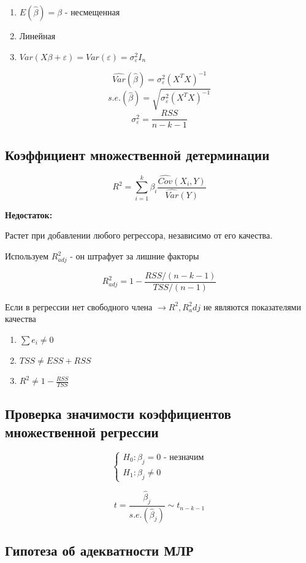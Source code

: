 \documentclass[a4paper, 12pt]{article}
\begin{document}
\begin{enumerate}
    \item $E(\hat{\beta}) = \beta$ - несмещенная
    \item Линейная
    \item $Var(X\beta + \varepsilon) = Var(\varepsilon) = \sigma_{\varepsilon}^2I_n$
\end{enumerate}

\[\hat{Var}(\hat{\beta}) = \sigma_{\varepsilon}^2(X^TX)^{-1}\]
\[s.e.(\hat{\beta}) = \sqrt{\sigma_{\varepsilon}^2(X^TX)^{-1}}\]
\[\sigma_{\varepsilon}^2 = \frac{RSS}{n - k - 1}\]

\subsection{Коэффициент множественной детерминации}

\[R^{2} = \sum_{i = 1}^k \beta_{i}\frac{\hat{Cov}(X_i, Y)}{\hat{Var}(Y)}\]

\textbf{Недостаток:}

Растет при добавлении любого регрессора, независимо от его качества.

Используем $R^2_{adj}$ - он штрафует за лишние факторы

\[R_{adj}^2 = 1 - \frac{RSS / (n - k - 1)}{TSS / (n - 1)}\]

Если в регрессии нет свободного члена $\rightarrow R^{2}, R^{2}_adj$
не являются показателями качества

\begin{enumerate}
    \item $\sum e_i \neq 0$
    \item $TSS \neq ESS + RSS$
    \item $R^{2} \neq 1 - \frac{RSS}{TSS}$
\end{enumerate}

\subsection{Проверка значимости коэффициентов множественной регрессии}

\[\begin{cases}
    H_0: \beta_j = 0 \textrm{ - незначим} \\
    H_1: \beta_j \neq 0
\end{cases}\]

\[t = \frac{\hat{\beta}_j}{s.e.(\hat{\beta}_j)} \sim t_{n - k - 1}\]

\subsection{Гипотеза об адекватности МЛР}
\end{document}
